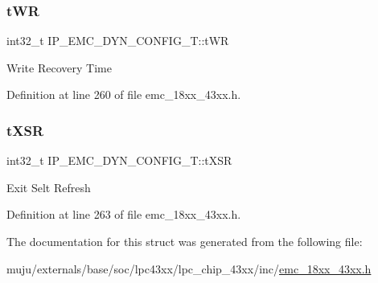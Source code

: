 \subsubsection{\texorpdfstring{t\+WR}{tWR}}
{\footnotesize\ttfamily int32\+\_\+t I\+P\+\_\+\+E\+M\+C\+\_\+\+D\+Y\+N\+\_\+\+C\+O\+N\+F\+I\+G\+\_\+\+T\+::t\+WR}

Write Recovery Time 

Definition at line 260 of file emc\+\_\+18xx\+\_\+43xx.\+h.

\mbox{\label{struct_i_p___e_m_c___d_y_n___c_o_n_f_i_g___t_af36b44006050db4ae7d2fbca93b5aa05}} 
\subsubsection{\texorpdfstring{t\+X\+SR}{tXSR}}
{\footnotesize\ttfamily int32\+\_\+t I\+P\+\_\+\+E\+M\+C\+\_\+\+D\+Y\+N\+\_\+\+C\+O\+N\+F\+I\+G\+\_\+\+T\+::t\+X\+SR}

Exit Selt Refresh 

Definition at line 263 of file emc\+\_\+18xx\+\_\+43xx.\+h.



The documentation for this struct was generated from the following file\+:\begin{DoxyCompactItemize}
\item 
muju/externals/base/soc/lpc43xx/lpc\+\_\+chip\+\_\+43xx/inc/\hyperlink{emc__18xx__43xx_8h}{emc\+\_\+18xx\+\_\+43xx.\+h}\end{DoxyCompactItemize}
